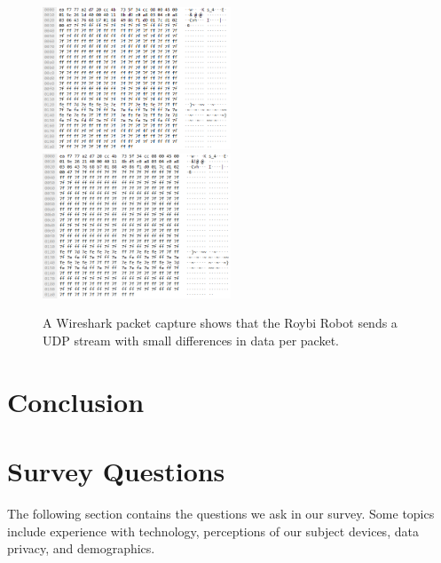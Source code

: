 \documentclass[12pt]{ucthesis}
\begin{document}
\begin{figure}
    \includegraphics[width=0.5\textwidth]{unencrypted1.png}
    \includegraphics[width=0.5\textwidth]{unencrypted2.png}
    \caption{A Wireshark packet capture shows that the Roybi Robot sends a UDP stream with small differences in data per packet.}
    \label{fig:unencrypted}
\end{figure}

\chapter{Conclusion}
\label{ch:conclusion}


\nocite{*}




\appendix
\chapter{Survey Questions}
\label{app:questions}
The following section contains the questions we ask in our survey. Some topics include experience with technology, perceptions of our subject devices, data privacy, and demographics.
\end{document}
